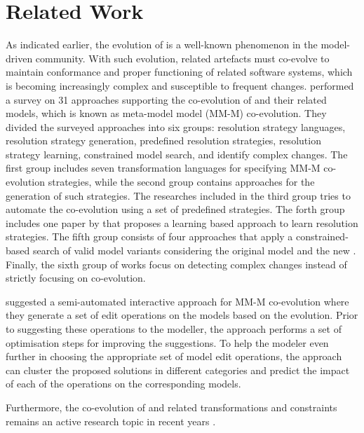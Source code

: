 \section{Related Work} \label{sec:RW}

As indicated earlier, the evolution of \metamodels is a well-known phenomenon in the model-driven community. With such evolution, related artefacts must co-evolve to maintain conformance and proper functioning of related software systems, which is becoming increasingly complex and susceptible to frequent changes. \Textcite{Hebig2017} performed a survey on 31 approaches supporting the co-evolution of \metamodels and their related models, which is known as meta-model model (MM-M) co-evolution. They divided the surveyed approaches into six groups: resolution strategy languages, resolution strategy generation, predefined resolution strategies, resolution strategy learning, constrained model search, and identify complex changes. The first group includes seven transformation languages for specifying MM-M co-evolution strategies, while the second group contains approaches for the generation of such strategies. The researches included in the third group tries to automate the co-evolution using a set of predefined strategies. The forth group includes one paper by \textcite{Anguel2013} that proposes a learning based approach to learn resolution strategies. The fifth group consists of four approaches that apply a constrained-based search of valid model variants considering the original model and the new \metamodel. Finally, the sixth group of works focus on detecting complex \metamodel changes instead of strictly focusing on co-evolution.

\Textcite{Kessentini2022} suggested a semi-automated interactive approach for MM-M co-evolution where they generate a set of edit operations on the models based on the \metamodel evolution. Prior to suggesting these operations to the modeller, the approach performs a set of optimisation steps for improving the suggestions. To help the modeler even further in choosing the appropriate set of model edit operations, the approach can cluster the proposed solutions in different categories and predict the impact of each of the operations on the corresponding models.

Furthermore, the co-evolution of \metamodel and related transformations and constraints remains an active research topic in recent years \cite{Kusel2015, Khelladi2017, garcia2013}.

